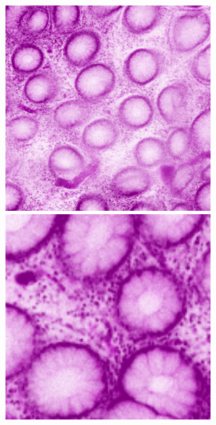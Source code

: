 \begin{figure}[H]
	\centering
	
	\begin{minipage}{0.24\columnwidth}
		\centering
		\includegraphics[clip, width=\linewidth]{fig/preprocessing/data_aug/rotate/ROTATION_0}
		\subcaption{0\deg}
	\end{minipage}
	\begin{minipage}{0.24\columnwidth}
		\centering
		\includegraphics[clip, width=\linewidth]{fig/preprocessing/data_aug/rotate/ROTATION_90}

\end{minipage}
\end{figure}
